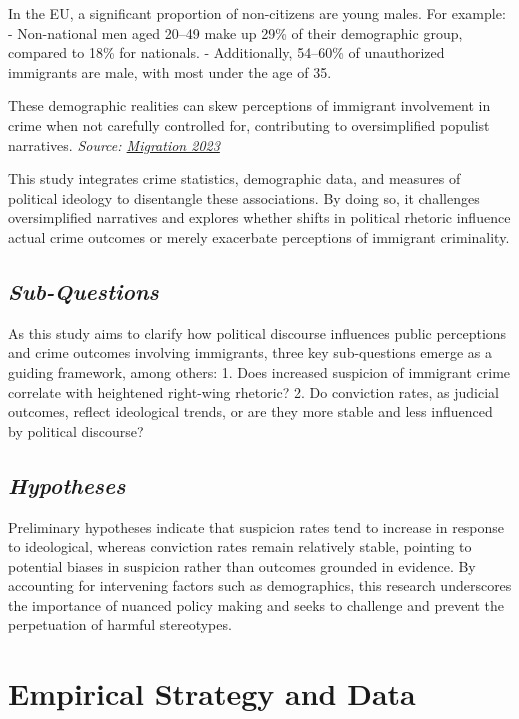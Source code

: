\documentclass[
]{article}
\begin{document}
In the EU, a significant proportion of non-citizens are young males. For
example: - Non-national men aged 20--49 make up 29\% of their
demographic group, compared to 18\% for nationals. - Additionally,
54--60\% of unauthorized immigrants are male, with most under the age of
35.

These demographic realities can skew perceptions of immigrant
involvement in crime when not carefully controlled for, contributing to
oversimplified populist narratives. \emph{Source:
\href{https://ec.europa.eu/eurostat/web/interactive-publications/migration-2023}{Migration
2023}}

This study integrates crime statistics, demographic data, and measures
of political ideology to disentangle these associations. By doing so, it
challenges oversimplified narratives and explores whether shifts in
political rhetoric influence actual crime outcomes or merely exacerbate
perceptions of immigrant criminality.

\subsection{\texorpdfstring{\emph{Sub-Questions}}{Sub-Questions}}\label{sub-questions}

As this study aims to clarify how political discourse influences public
perceptions and crime outcomes involving immigrants, three key
sub-questions emerge as a guiding framework, among others: 1. Does
increased suspicion of immigrant crime correlate with heightened
right-wing rhetoric? 2. Do conviction rates, as judicial outcomes,
reflect ideological trends, or are they more stable and less influenced
by political discourse?

\subsection{\texorpdfstring{\emph{Hypotheses}}{Hypotheses}}\label{hypotheses}

Preliminary hypotheses indicate that suspicion rates tend to increase in
response to ideological, whereas conviction rates remain relatively
stable, pointing to potential biases in suspicion rather than outcomes
grounded in evidence. By accounting for intervening factors such as
demographics, this research underscores the importance of nuanced policy
making and seeks to challenge and prevent the perpetuation of harmful
stereotypes.

\section{Empirical Strategy and Data}\label{empirical-strategy-and-data}
\end{document}
